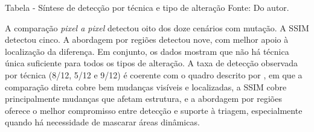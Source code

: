 \documentclass{UNESC}
\begin{document}
\vspace{0.2cm}
\begin{table}[H]
\centering
\captionlistentry{}
Tabela \thetable  \hspace{0.5pt} - {Síntese de detecção por técnica e tipo de alteração}
\label{tab:sintese}
\vspace{-0.3cm}
\flushleft
\hspace{0cm}\footnotesize Fonte: Do autor.
\end{table}

A comparação \emph{pixel a pixel} detectou oito dos doze cenários com mutação. A SSIM detectou cinco. A abordagem por regiões detectou nove, com melhor apoio à localização da diferença. Em conjunto, os dados mostram que não há técnica única suficiente para todos os tipos de alteração. A taxa de detecção observada por técnica (8/12, 5/12 e 9/12) é coerente com o quadro descrito por , em que a comparação direta cobre bem mudanças visíveis e localizadas, a SSIM cobre principalmente mudanças que afetam estrutura, e a abordagem por regiões oferece o melhor compromisso entre detecção e suporte à triagem, especialmente quando há necessidade de mascarar áreas dinâmicas.
\end{document}
